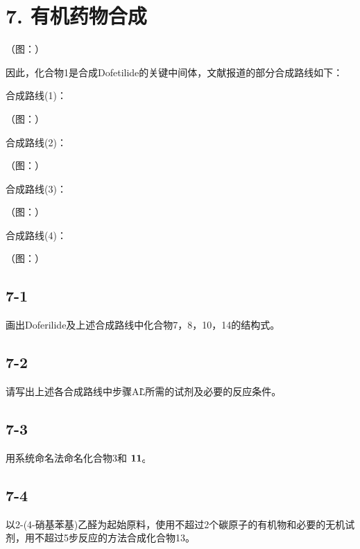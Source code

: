 \section*{7. 有机药物合成}
（图：）

因此，化合物1是合成Dofetilide的关键中间体，⽂献报道的部分合成路线如下：

合成路线(1)：

（图：）

合成路线(2)：

（图：）

合成路线(3)：

（图：）

合成路线(4)：

（图：）

\subsection*{7-1}
画出Doferilide及上述合成路线中化合物7，8，10，14的结构式。

\subsection*{7-2}
请写出上述各合成路线中步骤A\~L所需的试剂及必要的反应条件。

\subsection*{7-3}
⽤系统命名法命名化合物3和 ${ \bf 1 1 } _ { \tt c }$

\subsection*{7-4}
以2-(4-硝基苯基)⼄醛为起始原料，使⽤不超过2个碳原⼦的有机物和必要的⽆机试剂，⽤不超过5步反应的⽅法合成化合物13。
